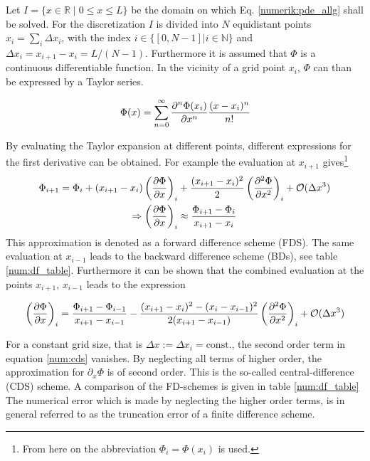 Let $I = \{x \in \mathbb{R} \;|\; 0 \leq x \leq L\}$ be the domain on which Eq. \ref{numerik:pde_allg} shall be solved.
For the discretization $I$ is divided into $N$ equidistant points $x_i = \sum_i \Delta x_i$, with the index ${i\in\{[0, N-1]|i\in\mathbb{N}\}}$
and ${\Delta x_i = x_{i+1} - x_i = L/(N-1)}$.
Furthermore it is assumed that $\Phi$ is a  continuous differentiable function.
In the vicinity of a grid point $x_i$, $\Phi$ can than be expressed by a Taylor series.

\begin{align}
    \label{num:taylor}
    \Phi(x) = \sum_{n=0}^{\infty} \pdn[^n\Phi(x_i)]{x^n} \frac{(x - x_i)^n}{n!}
\end{align}

By evaluating the Taylor expansion at different points, different expressions for the first derivative can be obtained.
For example the evaluation at $x_{i+1}$ gives\footnote{From here on the abbreviation $\Phi_i=\Phi(x_i)$ is used.}
\begin{align}
    \Phi_{i+1}  = \Phi_i + (x_{i+1} - x_i)\left(\pdn[\Phi]{x}\right)_i &+ \frac{(x_{i+1} -x_i)^2}{2}\left(\pdn[^2\Phi]{x^2}\right)_i + \mathcal{O}(\Delta x^3)\\
            \Rightarrow \left(\pdn[\Phi]{x}\right)_i &\approx \frac{\Phi_{i+1} - \Phi_{i}}{x_{i+1} - x_i}
\end{align}
This approximation is denoted as a forward difference scheme (FDS). The same evaluation at $x_{i-1}$ leads to the backward difference scheme (BDs), see table \ref{num:df_table}.
Furthermore it can be shown that the combined evaluation at the points $x_{i+1}$, $x_{i-1}$ leads to the expression

\begin{align}
    \label{num:cds}
    \left(\pdn[\Phi]{x}\right)_{i} = \frac{\Phi_{i+1} - \Phi_{i-1}}{x_{i+1} - x_{i-1}}
     - \frac{(x_{i+1} - x_i)^2 - (x_i - x_{i-1})^2}{2 (x_{i+1} - x_{i-1})}\left(\pdn[^2\Phi]{x^2}\right)_i + \mathcal{O}(\Delta x^3)
\end{align}

For a constant grid size, that is $\Delta x := \Delta x_i = \text{const.}$, the second order term in equation \ref{num:cds} vanishes.
By neglecting all terms of higher order, the approximation for $\partial_x \Phi$ is of second order.
This is the so-called central-difference (CDS) scheme. A comparison of the FD-schemes is given in table \ref{num:df_table}
The numerical error which is made by neglecting the higher order terms, is in general referred to as the truncation error of a finite difference scheme.


